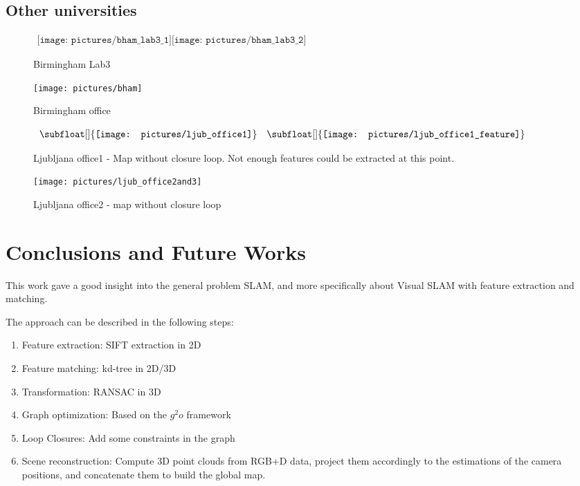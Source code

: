 \clearpage

\section{Other universities}

\begin{figure}[h]
\centering$
\begin{array}{c}
\texttt{[image: pictures/bham\_lab3\_1]}
\texttt{[image: pictures/bham\_lab3\_2]}
\end{array}$
\caption{Birmingham Lab3}
\end{figure}

\begin{figure}[h]
\centering
\texttt{[image: pictures/bham]}
\caption{Birmingham office}
\end{figure}

\begin{figure}[h]
\centering$
\begin{array}{cc}
\subfloat[]{\label{fig:ljub1_1} \texttt{[image: pictures/ljub\_office1]}} &
\subfloat[]{\label{fig:ljub1_2} \texttt{[image: pictures/ljub\_office1\_feature]}}
\end{array}$
\caption{Ljubljana office1 -  Map without closure loop.  Not enough features could be extracted at this point.}
\end{figure}


\begin{figure}[h]
\centering
\texttt{[image: pictures/ljub\_office2and3]}
\caption{Ljubljana office2 - map without closure loop}
\end{figure}

\chapter{Conclusions and Future Works}
\label{chap:conclusion}

This work gave a good insight into the general problem SLAM, and more specifically about Visual SLAM with feature extraction and matching.

The approach can be described in the following steps:
\begin{enumerate}
\item Feature extraction: SIFT extraction in 2D
\item Feature matching: kd-tree in 2D/3D
\item Transformation: RANSAC in 3D
\item Graph optimization: Based on the $g^2o$ framework
\item Loop Closures: Add some constraints in the graph
\item Scene reconstruction: Compute 3D point clouds from RGB+D data, project them accordingly to the estimations of the camera positions, and concatenate them to build the global map.
\end{enumerate}

